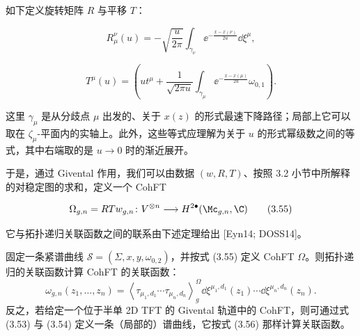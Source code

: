 
如下定义旋转矩阵 $R$ 与平移 $T$：

\begin{equation}
  R^\nu_\mu(u)=-\sqrt{\frac{u}{2\pi}}\int_{\gamma_\nu}\ee^{-\frac{x-x(\nu)}{2u}}\dd\xi^\mu,
  \tag{3.53}
\end{equation}

\begin{equation}
  T^\mu(u)=\left(ut^\mu+\frac{1}{\sqrt{2\pi u}}\int_{\gamma_\mu}\ee^{-\frac{x-x(\mu)}{2u}}\omega_{0,1}\right).
  \tag{3.54}
\end{equation}



这里 $\gamma_\mu$ 是从分歧点 $\mu$ 出发的、关于 $x(z)$ 的形式最速下降路径；局部上它可以取在 $\zeta_\mu$-平面内的实轴上。此外，这些等式应理解为关于 $u$ 的形式幂级数之间的等式，其中右端取的是 $u\to0$ 时的渐近展开。

于是，通过 Givental 作用，我们可以由数据 $(w,R,T)$、按照 3.2 小节中所解释的对稳定图的求和，定义一个 CohFT

\begin{equation}
  \Omega_{g,n}=RTw_{g,n}\colon V^{\otimes n}\longrightarrow H^{2\bullet}(\Mc_{g,n},\C)
  \tag{3.55}
\end{equation}

它与拓扑递归关联函数之间的联系由下述定理给出 [Eyn14; DOSS14]。


\begin{theorem}[3.9（CohFT/TR 对应）]
固定一条紧谱曲线 $\mathcal S=(\Sigma,x,y,\omega_{0,2})$，并按式 (3.55) 定义 CohFT $\Omega$。则拓扑递归的关联函数计算 CohFT 的关联函数：
\begin{equation}
  \omega_{g,n}(z_1,\dots,z_n)=\left\langle\tau_{\mu_1,d_1}\cdots\tau_{\mu_n,d_n}\right\rangle_g^{\Omega}\dd\xi^{\mu_1,d_1}(z_1)\cdots\dd\xi^{\mu_n,d_n}(z_n).
  \tag{3.56}
\end{equation}
反之，若给定一个位于半单 2D TFT 的 Givental 轨道中的 CohFT，则可通过式 (3.53) 与 (3.54) 定义一条（局部的）谱曲线，它按式 (3.56) 那样计算关联函数。
\end{theorem}


